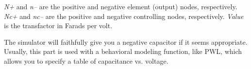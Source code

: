 {\it N+} and {\it n--} are the positive and negative element (output) nodes,
respectively.  {\it Nc+} and {\it nc--} are the positive and negative
controlling nodes, respectively.  {\it Value} is the transfactor in
Farads per volt.

The simulator will faithfully give you a negative capacitor if it
seems appropriate.  Usually, this part is used with a behavioral
modeling function, like PWL, which allows you to specify a table of
capacitance vs. voltage.
